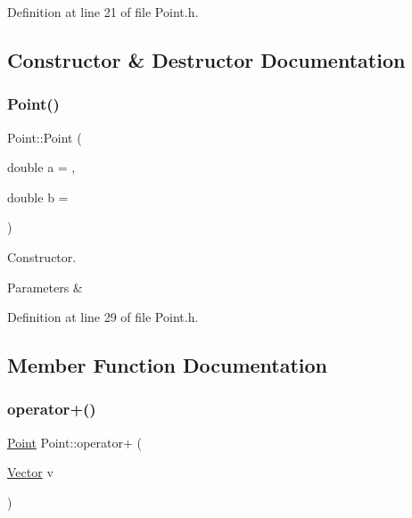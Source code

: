 Definition at line 21 of file Point.\+h.



\subsection{Constructor \& Destructor Documentation}
\mbox{\label{struct_point_ad426ece2a678805f7f2b9e6e0bfa33d3}} 
\subsubsection{\texorpdfstring{Point()}{Point()}}
{\footnotesize\ttfamily Point\+::\+Point (\begin{DoxyParamCaption}\item[{double}]{a = {},  }\item[{double}]{b = {} }\end{DoxyParamCaption})\hspace{0.3cm}{\ttfamily [inline]}}



Constructor. 


\begin{DoxyParams}{Parameters}
{\em } & \\
\hline
\end{DoxyParams}


Definition at line 29 of file Point.\+h.


\begin{DoxyCode}{0}

\end{DoxyCode}


\subsection{Member Function Documentation}
\mbox{\label{struct_point_a863eb9e840f8a70ab262f57dd5012f9e}} 
\subsubsection{\texorpdfstring{operator+()}{operator+()}}
{\footnotesize\ttfamily \mbox{\hyperlink{struct_point}{Point}} Point\+::operator+ (\begin{DoxyParamCaption}\item[{\mbox{\hyperlink{struct_vector}{Vector}}}]{v }\end{DoxyParamCaption})\hspace{0.3cm}{\ttfamily [inline]}}



